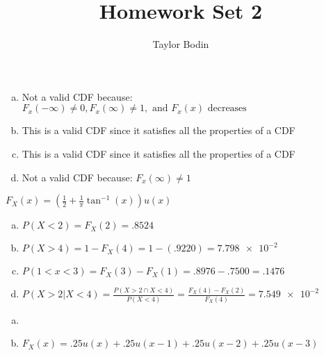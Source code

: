 \documentclass[12pt]{article}
\newenvironment{problem}[2][Problem]{\begin{trivlist}
\item[\hskip \labelsep {\bfseries #1}\hskip \labelsep {\bfseries #2.}]
  \vspace{1 cm}
}{\end{trivlist}}
\begin{document}
\title{Homework Set 2}
\author{Taylor Bodin}
\maketitle

\begin{problem}{3.1}
\item
  \begin{enumerate}[a.]
    \item %
      Not a valid CDF because: $F_x(-\infty) \neq 0, F_x(\infty) \neq 1,
      \textrm{ and } F_x(x) \textrm{ decreases}$
    \item %
      This is a valid CDF since it satisfies all the properties of a CDF
    \item %
      This is a valid CDF since it satisfies all the properties of a CDF
    \item %
      Not a valid CDF because: $F_x(\infty) \neq 1$
  \end{enumerate}
\end{problem}

\begin{problem}{3.3}
\item
  $F_X(x) = \left(\frac{1}{2} + \frac{1}{\pi}\tan^{-1}(x)\right)u(x)$
  \begin{enumerate}[a.]
    \item %
      $P(X < 2) = F_X(2) = .8524$
    \item %
      $P(X>4) = 1-F_X(4) = 1 - (.9220) = \num{7.798e-2}$
    \item %
      $P(1<x<3) = F_X(3) - F_X(1) = .8976 - .7500 = .1476$
    \item %
      $P(X>2 | X<4) = \frac{P(X>2 \cap X<4)}{P(X<4)} = \frac{F_X(4)
      -F_X(2)}{F_X(4)} = \num{7.549e-2}$
  \end{enumerate} 
\end{problem}

\begin{problem}{3.5} %
\item
  \begin{enumerate}[a.] 
    \item %
    \item %
      $F_X(x) = .25u(x) + .25u(x-1) + .25u(x-2) +.25u(x-3)$
  \end{enumerate}
\end{problem}
\end{document}
